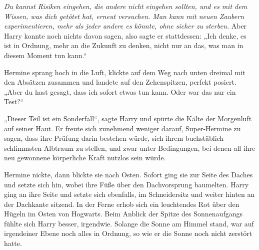 \emph{Du kannst Risiken eingehen, die andere nicht eingehen sollten, und es mit dem Wissen, was dich getötet hat, erneut versuchen. Man kann mit neuen Zaubern experimentieren, mehr als jeder andere es könnte, ohne sicher zu sterben.}
Aber Harry konnte noch nichts davon sagen, also sagte er stattdessen:
„Ich denke, es ist in Ordnung, mehr an die Zukunft zu denken, nicht nur an das, was man in diesem Moment tun kann.“

Hermine sprang hoch in die Luft, klickte auf dem Weg nach unten dreimal mit den Absätzen zusammen und landete auf den Zehenspitzen, perfekt posiert.
„Aber du hast gesagt, dass ich sofort etwas tun kann. Oder war das nur ein Test?“

„Dieser Teil ist ein Sonderfall“, sagte Harry und spürte die Kälte der Morgenluft auf seiner Haut.
Er freute sich zunehmend weniger darauf, Super-Hermine zu sagen, dass ihre Prüfung darin bestehen würde, sich ihrem buchstäblich schlimmsten Albtraum zu stellen, und zwar unter Bedingungen, bei denen all ihre neu gewonnene körperliche Kraft nutzlos sein würde.

Hermine nickte, dann blickte sie nach Osten. Sofort ging sie zur Seite des Daches und setzte sich hin, wobei ihre Füße über den Dachvorsprung baumelten. Harry ging an ihre Seite und setzte sich ebenfalls, im Schneidersitz und weiter hinten an der Dachkante sitzend.
In der Ferne erhob sich ein leuchtendes Rot über den Hügeln im Osten von Hogwarts.
Beim Anblick der Spitze des Sonnenaufgangs fühlte sich Harry besser, irgendwie. Solange die Sonne am Himmel stand, war auf irgendeiner Ebene noch alles in Ordnung, so wie er die Sonne noch nicht zerstört hatte.

